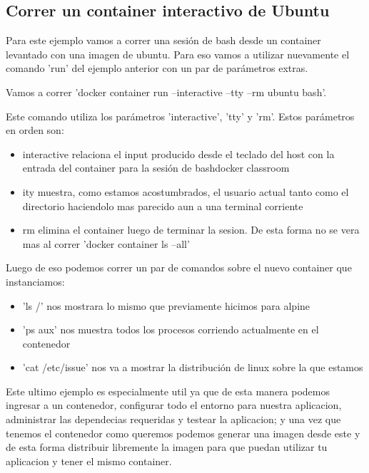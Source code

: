 \documentclass[11pt]{article} %
\begin{document}
\subsection{Correr un container interactivo de Ubuntu}

Para este ejemplo vamos a correr una sesión de bash desde un container levantado con una imagen de ubuntu. Para eso vamos a utilizar nuevamente el comando 'run' del ejemplo anterior con un par de parámetros extras.

Vamos a correr 'docker container run --interactive --tty --rm ubuntu bash'. 

Este comando utiliza los parámetros 'interactive', 'tty' y 'rm'. Estos parámetros en orden son:
\begin{itemize}

	\item
    interactive relaciona el input producido desde el teclado del host con la entrada del container para la sesión de bashdocker classroom
    
    \item
    ity muestra, como estamos acostumbrados, el usuario actual tanto como el directorio haciendolo mas parecido aun a una terminal corriente
    
    \item
    rm elimina el container luego de terminar la sesion. De esta forma no se vera mas al correr 'docker container ls --all'
\end{itemize}

Luego de eso podemos correr un par de comandos sobre el nuevo container que instanciamos:
\begin{itemize}
	\item    
    'ls /' nos mostrara lo mismo que previamente hicimos para alpine
    
    \item  
    'ps aux' nos muestra todos los procesos corriendo actualmente en el contenedor
    
    \item  
    'cat /etc/issue' nos va a mostrar la distribución de linux sobre la que estamos
\end{itemize}

Este ultimo ejemplo es especialmente util ya que de esta manera podemos ingresar a un contenedor, configurar todo el entorno para nuestra aplicacion, administrar las dependecias requeridas y testear la aplicacion; y una vez que tenemos el contenedor como queremos podemos generar una imagen desde este y de esta forma distribuir libremente la imagen para que puedan utilizar tu aplicacion y tener el mismo container.
\end{document}
